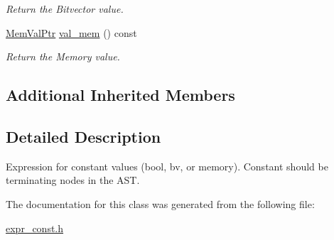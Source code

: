 \begin{DoxyCompactItemize}
\begin{DoxyCompactList}\small\item\em Return the Bitvector value. \end{DoxyCompactList}\item 
\mbox{\label{classilang_1_1_expr_const_ac328336c8f411c04c6952f71442ff76e}} 
\mbox{\hyperlink{namespaceilang_a4fd677b2cf7cb4e83a1e81f35e9aec6b}{Mem\+Val\+Ptr}} \mbox{\hyperlink{classilang_1_1_expr_const_ac328336c8f411c04c6952f71442ff76e}{val\+\_\+mem}} () const
\begin{DoxyCompactList}\small\item\em Return the Memory value. \end{DoxyCompactList}\end{DoxyCompactItemize}
\subsection*{Additional Inherited Members}


\subsection{Detailed Description}
Expression for constant values (bool, bv, or memory). Constant should be terminating nodes in the A\+ST. 

The documentation for this class was generated from the following file\+:\begin{DoxyCompactItemize}
\item 
\mbox{\hyperlink{expr__const_8h}{expr\+\_\+const.\+h}}\end{DoxyCompactItemize}
